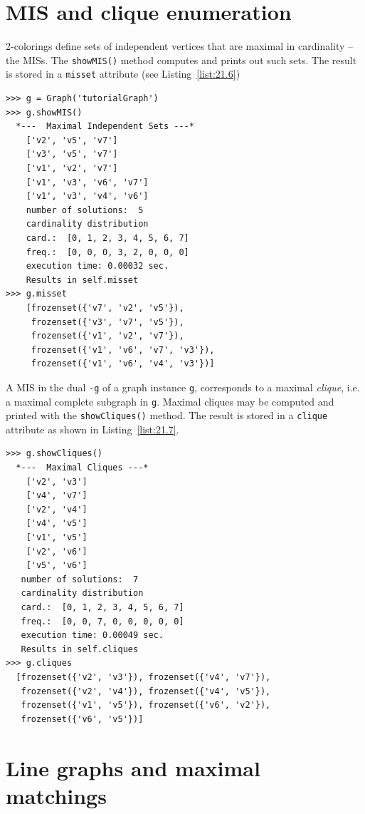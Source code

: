 \section{MIS and clique enumeration}
\label{sec:21.3}

2-colorings define sets of independent vertices that are maximal in cardinality --the MISs. The \texttt{showMIS()} method  computes and prints out such sets. The result is stored in a \texttt{misset} attribute (see Listing~\vref{list:21.6})
\begin{lstlisting}[caption={Computing and printing the maximal independent sets of graph \texttt{g}},label=list:21.6]
>>> g = Graph('tutorialGraph')
>>> g.showMIS()
  *---  Maximal Independent Sets ---*
    ['v2', 'v5', 'v7']
    ['v3', 'v5', 'v7']
    ['v1', 'v2', 'v7']
    ['v1', 'v3', 'v6', 'v7']
    ['v1', 'v3', 'v4', 'v6']
    number of solutions:  5
    cardinality distribution
    card.:  [0, 1, 2, 3, 4, 5, 6, 7]
    freq.:  [0, 0, 0, 3, 2, 0, 0, 0]
    execution time: 0.00032 sec.
    Results in self.misset
>>> g.misset
    [frozenset({'v7', 'v2', 'v5'}), 
     frozenset({'v3', 'v7', 'v5'}), 
     frozenset({'v1', 'v2', 'v7'}), 
     frozenset({'v1', 'v6', 'v7', 'v3'}), 
     frozenset({'v1', 'v6', 'v4', 'v3'})]
\end{lstlisting}

A MIS in the dual \texttt{-g} of a graph instance \texttt{g}, corresponds to a maximal \emph{clique}, i.e. a maximal complete subgraph in \texttt{g}. Maximal cliques may be computed and printed with the \texttt{showCliques()} method. The result is stored in a \texttt{clique} attribute as shown in Listing~\vref{list:21.7}.
\begin{lstlisting}[caption={Computing and printing the maximal independent sets of graph \texttt{g}},label=list:21.7]
>>> g.showCliques()
  *---  Maximal Cliques ---*
    ['v2', 'v3']
    ['v4', 'v7']
    ['v2', 'v4']
    ['v4', 'v5']
    ['v1', 'v5']
    ['v2', 'v6']
    ['v5', 'v6']
   number of solutions:  7
   cardinality distribution
   card.:  [0, 1, 2, 3, 4, 5, 6, 7]
   freq.:  [0, 0, 7, 0, 0, 0, 0, 0]
   execution time: 0.00049 sec.
   Results in self.cliques
>>> g.cliques
  [frozenset({'v2', 'v3'}), frozenset({'v4', 'v7'}), 
   frozenset({'v2', 'v4'}), frozenset({'v4', 'v5'}), 
   frozenset({'v1', 'v5'}), frozenset({'v6', 'v2'}), 
   frozenset({'v6', 'v5'})]
\end{lstlisting}

\section{Line graphs and maximal matchings}
\label{sec:21.4}

